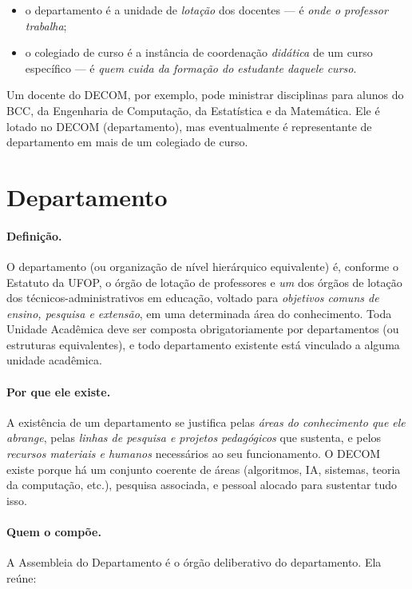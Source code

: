 \documentclass[10pt,a4paper]{extarticle}
\newcommand{\impt}[1]{\textcolor{important}{#1}}
\newcommand{\ntc}[1]{\textcolor{notice}{#1}}
\begin{document}
\begin{itemize}
    \item o \impt{departamento} é a unidade de \emph{lotação} dos docentes --- é \emph{onde o professor trabalha};
    \item o \impt{colegiado de curso} é a instância de coordenação \emph{didática} de um curso específico --- é \emph{quem cuida da formação do estudante daquele curso}.
\end{itemize}

\ntc{Um docente do DECOM, por exemplo, pode ministrar disciplinas para alunos do BCC, da Engenharia de Computação, da Estatística e da Matemática. Ele é lotado no DECOM (departamento), mas eventualmente é representante de departamento em mais de um colegiado de curso.}

\section{Departamento}

\paragraph{Definição.} O departamento (ou organização de nível hierárquico equivalente) é, conforme o Estatuto da UFOP, o \impt{órgão de lotação de professores} e \emph{um} dos órgãos de lotação dos técnicos-administrativos em educação, voltado para \emph{objetivos comuns de ensino, pesquisa e extensão}, em uma determinada área do conhecimento. Toda Unidade Acadêmica deve ser composta obrigatoriamente por departamentos (ou estruturas equivalentes), e todo departamento existente está vinculado a alguma unidade acadêmica.

\paragraph{Por que ele existe.} A existência de um departamento se justifica pelas \emph{áreas do conhecimento que ele abrange}, pelas \emph{linhas de pesquisa e projetos pedagógicos} que sustenta, e pelos \emph{recursos materiais e humanos} necessários ao seu funcionamento. O DECOM existe porque há um conjunto coerente de áreas (algoritmos, IA, sistemas, teoria da computação, etc.), pesquisa associada, e pessoal alocado para sustentar tudo isso.

\paragraph{Quem o compõe.} A \impt{Assembleia do Departamento} é o órgão deliberativo do departamento. Ela reúne:
\end{document}
